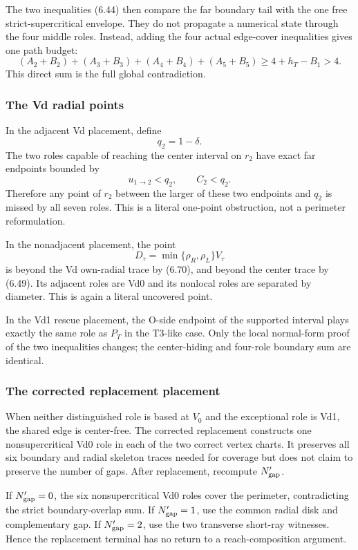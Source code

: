 The two inequalities (6.44) then compare the far boundary tail with the one
free strict-supercritical envelope.  They do not propagate a numerical state
through the four middle roles.  Instead, adding the four actual edge-cover
inequalities gives one path budget:
\[
(A_2+B_2)+(A_3+B_3)+(A_4+B_4)+(A_5+B_5)
\ge4+h_T-B_1>4.
\]
This direct sum is the full global contradiction.

\subsubsection{The Vd radial points}

In the adjacent Vd placement, define
\[
 q_2=1-\delta.
\]
The two roles capable of reaching the center interval on $r_2$ have exact
far endpoints bounded by
\[
 u_{1\to2}<q_2,
 \qquad
 C_2<q_2.
\]
Therefore any point of $r_2$ between the larger of these two endpoints and
$q_2$ is missed by all seven roles.  This is a literal one-point obstruction,
not a perimeter reformulation.

In the nonadjacent placement, the point
\[
 D_\tau=\min\{\rho_R,\rho_L\}V_\tau
\]
is beyond the Vd own-radial trace by (6.70), and beyond the center trace by
(6.49).  Its adjacent roles are Vd0 and its nonlocal roles are separated by
diameter.  This is again a literal uncovered point.

In the Vd1 rescue placement, the O-side endpoint of the supported interval
plays exactly the same role as $P_T$ in the T3-like case.  Only the local
normal-form proof of the two inequalities changes; the center-hiding and
four-role boundary sum are identical.

\subsubsection{The corrected replacement placement}

When neither distinguished role is based at $V_0$ and the exceptional role is
Vd1, the shared edge is center-free.  The corrected replacement constructs
one nonsupercritical Vd0 role in each of the two correct vertex charts.  It
preserves all six boundary and radial skeleton traces needed for coverage but
does not claim to preserve the number of gaps.  After replacement, recompute
$N'_{\rm gap}$.

If $N'_{\rm gap}=0$, the six nonsupercritical Vd0 roles cover the perimeter,
contradicting the strict boundary-overlap sum.  If $N'_{\rm gap}=1$, use the
common radial disk and complementary gap.  If $N'_{\rm gap}=2$, use the two
transverse short-ray witnesses.  Hence the replacement terminal has no return
to a reach-composition argument.


